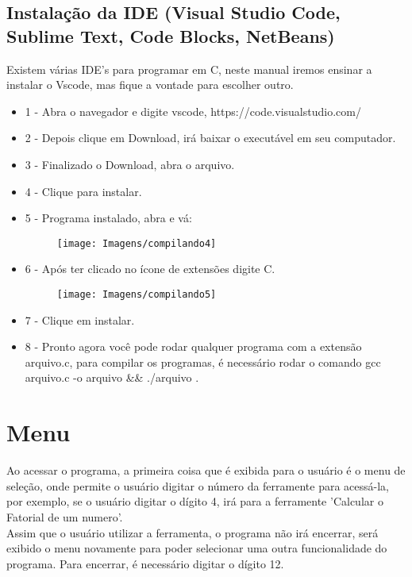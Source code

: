\documentclass[12pt]{article}
\begin{document}
\subsection {Instalação da IDE (Visual Studio Code, Sublime Text, Code Blocks, NetBeans)}
Existem várias IDE’s para programar em C, neste manual iremos ensinar a instalar o Vscode, mas fique a vontade para escolher outro.
\begin{itemize}
\item 1 - Abra o navegador e digite vscode, https://code.visualstudio.com/
\item 2 - Depois clique em Download, irá baixar o executável em seu computador.
\item 3 - Finalizado o Download, abra o arquivo.
\item 4 - Clique para instalar.
\item 5 - Programa instalado, abra e vá:

\begin{figure}[!htb]
     \centering
     \texttt{[image: Imagens/compilando4]}
     \label{Label de referência para a imagem}
\end{figure}

\item 6 - Após ter clicado no ícone de extensões digite C.

\begin{figure}[!htb]
     \centering
     \texttt{[image: Imagens/compilando5]}
     \label{Label de referência para a imagem}
\end{figure}

\item 7 - Clique em instalar.
 
\item 8 - Pronto agora você pode rodar qualquer programa com a extensão arquivo.c, para compilar os programas, é necessário rodar o comando gcc arquivo.c -o arquivo \&\& ./arquivo .

\end{itemize}

\newpage

\section{Menu} \label{sec:analise}
Ao acessar o programa, a primeira coisa que é exibida para o usuário é o menu de seleção, onde permite o usuário digitar o número da ferramente para acessá-la, por exemplo, se o usuário digitar o dígito 4, irá para a ferramente 'Calcular o Fatorial de um numero'. \\
Assim que o usuário utilizar a ferramenta, o programa não irá encerrar, será exibido o menu novamente para poder selecionar uma outra funcionalidade do programa. Para encerrar, é necessário digitar o dígito 12.\\
\end{document}
